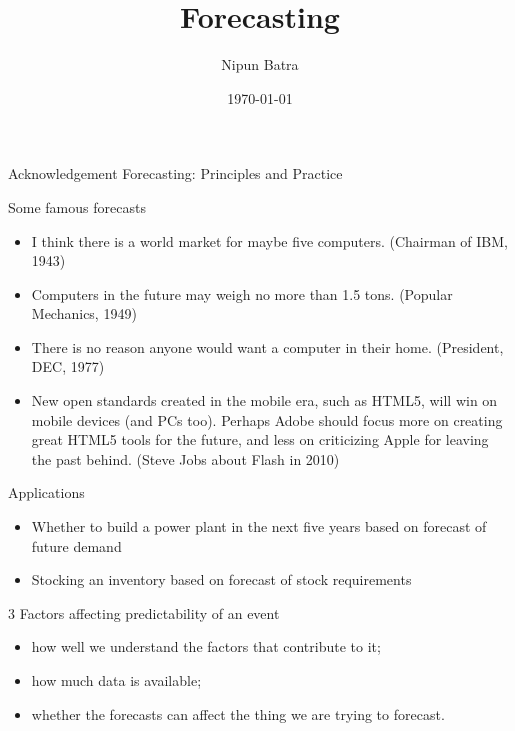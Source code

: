 \documentclass{beamer}
\title{Forecasting}
\date{\today}
\author{Nipun Batra}
\institute{IIT Gandhinagar}
\begin{document}
  \maketitle
  
  
 \begin{frame}{Acknowledgement}
 Forecasting: Principles and Practice

\end{frame}

\begin{frame}{Some famous forecasts}
\begin{itemize}
	\item I think there is a world market for maybe five computers. (Chairman of IBM, 1943)
	\item Computers in the future may weigh no more than 1.5 tons. (Popular Mechanics, 1949)
	\item There is no reason anyone would want a computer in their home. (President, DEC, 1977)
	\item New open standards created in the mobile era, such as HTML5, will win on mobile devices (and PCs too). Perhaps Adobe should focus more on creating great HTML5 tools for the future, and less on criticizing Apple for leaving the past behind. (Steve Jobs about Flash in 2010)
\end{itemize}
\end{frame}


\begin{frame}{Applications}
\begin{itemize}
	\item Whether to build a power plant in the next five years based on forecast of future demand 
	\item Stocking an inventory based on forecast of stock requirements
\end{itemize}
\end{frame}

\begin{frame}{3 Factors affecting predictability of an event}
\begin{itemize}
\item how well we understand the factors that contribute to it;
\item how much data is available;
\item whether the forecasts can affect the thing we are trying to forecast.
\end{itemize}

\end{frame}
\end{document}
